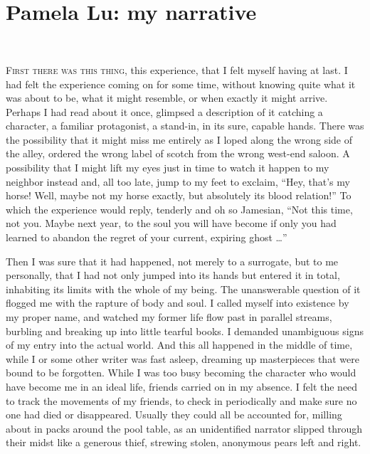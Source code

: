 \documentclass[
]{memoir}
\begin{document}
~

~

\hypertarget{pamela-lu-my-narrative}{%
\chapter{Pamela Lu: my narrative}\label{pamela-lu-my-narrative}}

~

\lettrine[lines=3, findent=0em, nindent=0.1em, lhang=0]{F}{irst there was this thing},
this experience, that I felt myself having at last. I had felt the
experience coming on for some time, without knowing quite what it was
about to be, what it might resemble, or when exactly it might arrive.
Perhaps I had read about it once, glimpsed a description of it catching
a character, a familiar protagonist, a stand-in, in its sure, capable
hands. There was the possibility that it might miss me entirely as I
loped along the wrong side of the alley, ordered the wrong label of
scotch from the wrong west-end saloon. A possibility that I might lift
my eyes just in time to watch it happen to my neighbor instead and, all
too late, jump to my feet to exclaim, ``Hey, that's my horse! Well,
maybe not my horse exactly, but absolutely its blood relation!'' To
which the experience would reply, tenderly and oh so Jamesian, ``Not
this time, not you. Maybe next year, to the soul you will have become if
only you had learned to abandon the regret of your current, expiring
ghost \ldots{}''

Then I was sure that it had happened, not merely to a surrogate, but to
me personally, that I had not only jumped into its hands but entered it
in total, inhabiting its limits with the whole of my being. The
unanswerable question of it flogged me with the rapture of body and
soul. I called myself into existence by my proper name, and watched my
former life flow past in parallel streams, burbling and breaking up into
little tearful books. I demanded unambiguous signs of my entry into the
actual world. And this all happened in the middle of time, while I or
some other writer was fast asleep, dreaming up masterpieces that were
bound to be forgotten. While I was too busy becoming the character who
would have become me in an ideal life, friends carried on in my absence.
I felt the need to track the movements of my friends, to check in
periodically and make sure no one had died or disappeared. Usually they
could all be accounted for, milling about in packs around the pool
table, as an unidentified narrator slipped through their midst like a
generous thief, strewing stolen, anonymous pears left and right.
\end{document}
